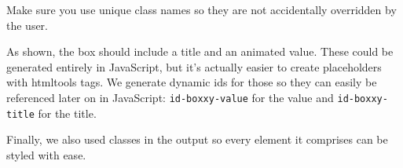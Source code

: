 \documentclass[10pt,]{krantz}
\makeatletter
\newenvironment{Shaded}{\begin{snugshade}}{\end{snugshade}}
\newcommand{\CommentTok}[1]{\textcolor[rgb]{0.37,0.37,0.37}{\textit{#1}}}
\newcommand{\ConstantTok}[1]{\textcolor[rgb]{0,0,0}{#1}}
\newcommand{\ControlFlowTok}[1]{\textcolor[rgb]{0.27,0.27,0.27}{\textbf{#1}}}
\newcommand{\DataTypeTok}[1]{\textcolor[rgb]{0.27,0.27,0.27}{#1}}
\newcommand{\DecValTok}[1]{\textcolor[rgb]{0.06,0.06,0.06}{#1}}
\newcommand{\FunctionTok}[1]{\textcolor[rgb]{0,0,0}{#1}}
\newcommand{\KeywordTok}[1]{\textcolor[rgb]{0.27,0.27,0.27}{\textbf{#1}}}
\newcommand{\NormalTok}[1]{#1}
\newcommand{\OperatorTok}[1]{\textcolor[rgb]{0.43,0.43,0.43}{\textbf{#1}}}
\newcommand{\StringTok}[1]{\textcolor[rgb]{0.5,0.5,0.5}{#1}}
\newenvironment{kframe}{%
\medskip{}
\setlength{\fboxsep}{.8em}
 \def\at@end@of@kframe{}%
 \ifinner\ifhmode%
  \def\at@end@of@kframe{\end{minipage}}%
  \begin{minipage}{\columnwidth}%
 \fi\fi%
 \def\FrameCommand##1{\hskip\@totalleftmargin \hskip-\fboxsep
 \colorbox{shadecolor}{##1}\hskip-\fboxsep
     \hskip-\linewidth \hskip-\@totalleftmargin \hskip\columnwidth}%
 \MakeFramed {\advance\hsize-\width
   \@totalleftmargin\z@ \linewidth\hsize
   \@setminipage}}%
 {\par\unskip\endMakeFramed%
 \at@end@of@kframe}
\renewenvironment{Shaded}{\begin{kframe}}{\end{kframe}}
\newenvironment{rmdblock}[1]
  {
  \begin{itemize}
  \renewcommand{\labelitemi}{
    \raisebox{-.7\height}[0pt][0pt]{
      {\setkeys{Gin}{width=3em,keepaspectratio}\texttt{[image: images/\#1]}}
    }
  }
  \setlength{\fboxsep}{1em}
  \begin{kframe}
  \item
  }
  {
  \end{kframe}
  \end{itemize}
  }
\newenvironment{rmdnote}
  {\begin{rmdblock}{note}}
  {\end{rmdblock}}
\makeatother
\begin{document}
\begin{rmdnote}
Make sure you use unique class names so they are not accidentally
overridden by the user.
\end{rmdnote}

As shown, the box should include a title and an animated value. These could be generated entirely in JavaScript, but it's actually easier to create placeholders with htmltools tags. We generate dynamic ids for those so they can easily be referenced later on in JavaScript: \texttt{id-boxxy-value} for the value and \texttt{id-boxxy-title} for the title.

\begin{Shaded}
\end{Shaded}

Finally, we also used classes in the output so every element it comprises can be styled with ease.

\begin{Shaded}
\end{Shaded}
\end{document}
